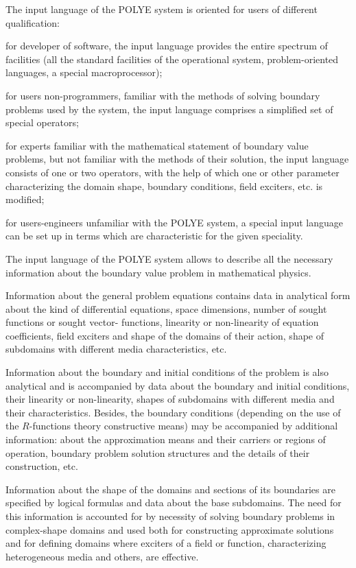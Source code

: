 The input language of the POLYE system is oriented for users of different
qualification:

for developer of software, the input language provides the entire spectrum
of facilities (all the standard facilities of the operational system,
problem-oriented languages, a special macroprocessor);

for users non-programmers, familiar with the methods of solving boundary
problems used by the system, the input language comprises a simplified set
of special operators;

for experts familiar with the mathematical statement of boundary value
problems, but not familiar with the methods of their solution, the input
language consists of one or two operators, with the help of which one or
other parameter characterizing the domain shape, boundary conditions, field
exciters, etc. is modified;

for users-engineers unfamiliar with the POLYE system, a special input
language can be set up in terms which are characteristic for the given
speciality.

The input language of the POLYE system allows to describe all the necessary
information about the boundary value problem in mathematical physics.

Information about the general problem equations contains data in analytical
form about the kind of differential equations, space dimensions, number of
sought functions or sought vector- functions, linearity or non-linearity of
equation coefficients, field exciters and shape of the domains of their
action, shape of subdomains with different media characteristics, etc.

Information about the boundary and initial conditions of the problem is also
analytical and is accompanied by data about the boundary and initial
conditions, their linearity or non-linearity, shapes of subdomains with
different media and their characteristics. Besides, the boundary conditions
(depending on the use of the $R$-functions theory constructive means) may be
accompanied by additional information: about the approximation means and
their carriers or regions of operation, boundary problem solution structures
and the details of their construction, etc.

Information about the shape of the domains and sections of its boundaries
are specified by logical formulas and data about the base subdomains. The
need for this information is accounted for by necessity of solving boundary
problems in complex-shape domains and used both for constructing approximate
solutions and for defining domains where exciters of a field or function,
characterizing heterogeneous media and others, are effective.

